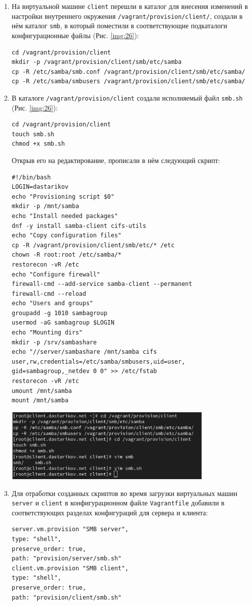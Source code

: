 \begin{enumerate}
\item На виртуальной машине {\tt client} перешли в каталог для внесения изменений в настройки внутреннего окружения {\tt /vagrant/provision/client/}, создали в нём каталог {\tt smb}, в который поместили в соответствующие подкаталоги конфигурационные файлы (Рис. \ref{img:26}):
    \begin{verbatim}
cd /vagrant/provision/client
mkdir -p /vagrant/provision/client/smb/etc/samba
cp -R /etc/samba/smb.conf /vagrant/provision/client/smb/etc/samba/
cp -R /etc/samba/smbusers /vagrant/provision/client/smb/etc/samba/
    \end{verbatim}
\item В каталоге {\tt /vagrant/provision/client} создали исполняемый файл {\tt smb.sh} (Рис. \ref{img:26}):
    \begin{verbatim}
cd /vagrant/provision/client
touch smb.sh
chmod +x smb.sh
    \end{verbatim}
Открыв его на редактирование, прописали в нём следующий скрипт:
    \begin{verbatim}
#!/bin/bash
LOGIN=dastarikov
echo "Provisioning script $0"
mkdir -p /mnt/samba
echo "Install needed packages"
dnf -y install samba-client cifs-utils
echo "Copy configuration files"
cp -R /vagrant/provision/client/smb/etc/* /etc
chown -R root:root /etc/samba/*
restorecon -vR /etc
echo "Configure firewall"
firewall-cmd --add-service samba-client --permanent
firewall-cmd --reload
echo "Users and groups"
groupadd -g 1010 sambagroup
usermod -aG sambagroup $LOGIN
echo "Mounting dirs"
mkdir -p /srv/sambashare
echo "//server/sambashare /mnt/samba cifs user,rw,credentials=/etc/samba/smbusers,uid=user, gid=sambagroup,_netdev 0 0" >> /etc/fstab
restorecon -vR /etc
umount /mnt/samba
mount /mnt/samba
    \end{verbatim}

\begin{center}
    \centering
    \includegraphics[width=0.8\textwidth]{../images/image26.png}
    \label{img:26}
\end{center}

\item Для отработки созданных скриптов во время загрузки виртуальных машин {\tt server} и {\tt client} в конфигурационном файле {\tt Vagrantfile} добавили в соответствующих разделах конфигураций для сервера и клиента:
    \begin{verbatim}
server.vm.provision "SMB server",
type: "shell",
preserve_order: true,
path: "provision/server/smb.sh"
client.vm.provision "SMB client",
type: "shell",
preserve_order: true,
path: "provision/client/smb.sh"
    \end{verbatim}
\end{enumerate}

